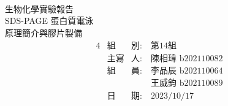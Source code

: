 


\pagestyle{empty}

\begin{center}
~\\
\vspace{2.7cm}
{\fontsize{36}{120}\selectfont 生物化學實驗報告}\\
\vspace{2.2cm}
{\fontsize{36}{80}\selectfont SDS-PAGE 蛋白質電泳\\原理簡介與膠片製備}
\vspace{2cm}
{\fontsize{18}{20}\selectfont 
  \begin{alignat*}{4}
    &\text{組}&\text{別}:\ &\text{第14組}\\
    &\text{主寫}&\text{人}:\ &\text{陳相瑋 b202110082}\\
    &\text{組}&\text{員}:\ &\text{李品辰 b202110064}\\
         &&&\text{王威鈞 b202110089}\\
    &\text{日}&\text{期}:\ &\text{2023/10/17}\\
  \end{alignat*}    
}


\end{center}
\newpage
